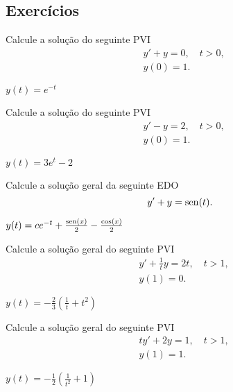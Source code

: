 \subsection*{Exercícios}

\begin{exer}
  Calcule a solução do seguinte PVI
  \begin{align}
    &y' + y = 0, \quad t>0, \\
    &y(0) = 1.    
  \end{align}
\end{exer}
\begin{resp}
  $y(t) = e^{-t}$
\end{resp}

\begin{exer}
  Calcule a solução do seguinte PVI
  \begin{align}
    &y' - y = 2, \quad t>0, \\
    &y(0) = 1.    
  \end{align}
\end{exer}
\begin{resp}
  $y(t) = 3e^{t}-2$
\end{resp}

\begin{exer}
  Calcule a solução geral da seguinte EDO
  \begin{equation}
    y' + y = \operatorname{sen}(t).
  \end{equation}
\end{exer}
\begin{resp}
  $y(t) = ce^{-t} + \frac{\operatorname{sen}(x)}{2} - \frac{\cos(x)}{2}$
\end{resp}

\begin{exer}
  Calcule a solução geral do seguinte PVI
  \begin{align}
    &y' + \frac{1}{t}y = 2t,\quad t>1,\\
    &y(1) = 0.
  \end{align}
\end{exer}
\begin{resp}
  $y(t) = -\frac{2}{3}\left(\frac{1}{t} + t^2\right)$
\end{resp}

\begin{exer}
  Calcule a solução geral do seguinte PVI
  \begin{align}
    &ty' + 2y = 1,\quad t>1,\\
    &y(1) = 1.
  \end{align}
\end{exer}
\begin{resp}
  $y(t) = -\frac{1}{2}\left(\frac{1}{t^2} + 1\right)$
\end{resp}

